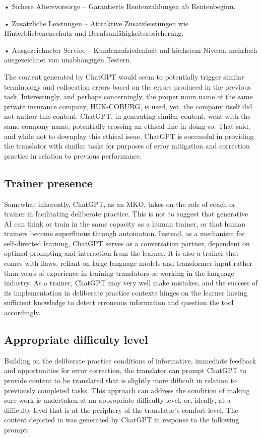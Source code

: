 \documentclass[output=paper]{langscibook}
\begin{document}
• Sichere Altersvorsorge – Garantierte Rentenzahlungen ab Rentenbeginn.

• Zusätzliche Leistungen – Attraktive Zusatzleistungen wie Hinterbliebenenschutz und Berufsunfähigkeitsabsicherung.

• Ausgezeichneter Service – Kundenzufriedenheit auf höchstem Niveau, mehrfach ausgezeichnet von unabhängigen Testern.
\z

The content generated by ChatGPT would seem to potentially trigger similar terminology and collocation errors based on the errors produced in the previous task. Interestingly, and perhaps concerningly, the proper noun name of the same private insurance company, HUK-COBURG, is used, yet, the company itself did not author this content. ChatGPT, in generating similar content, went with the same company name, potentially crossing an ethical line in doing so. That said, and while not to downplay this ethical issue, ChatGPT is successful in providing the translator with similar tasks for purposes of error mitigation and correction practice in relation to previous performance.

\subsection{Trainer presence}

Somewhat inherently, ChatGPT, as an MKO, takes on the role of coach or trainer in facilitating deliberate practice. This is not to suggest that generative AI can think or train in the same capacity as a human trainer, or that human trainers become superfluous through automation. Instead, as a mechanism for self-directed learning, ChatGPT serves as a conversation partner, dependent on optimal prompting and interaction from the learner. It is also a trainer that comes with flaws, reliant on large language models and transformer input rather than years of experience in training translators or working in the language industry. As a trainer, ChatGPT may very well make mistakes, and the success of its implementation in deliberate practice contexts hinges on the learner having sufficient knowledge to detect erroneous information and question the tool accordingly.~

\subsection{Appropriate difficulty level}

Building on the deliberate practice conditions of informative, immediate feedback and opportunities for error correction, the translator can prompt ChatGPT to provide content to be translated that is slightly more difficult in relation to previously completed tasks. This approach can address the condition of making sure work is undertaken at an appropriate difficulty level, or, ideally, at a difficulty level that is at the periphery of the translator’s comfort level. The content depicted in  was generated by ChatGPT in response to the following prompt:
\end{document}

